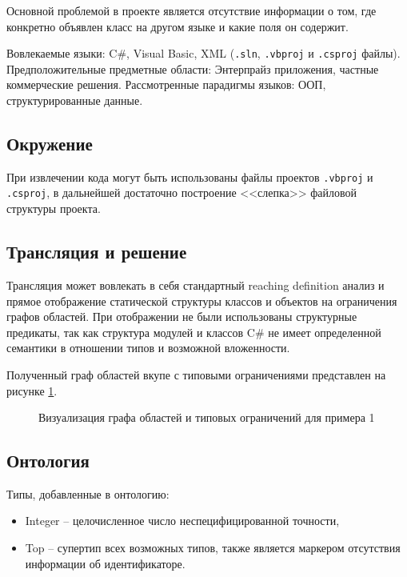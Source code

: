 Основной проблемой в проекте является отсутствие информации о том, где конкретно объявлен класс на другом языке и какие поля он содержит.

Вовлекаемые языки: C\#, Visual Basic, XML (\texttt{.sln}, \texttt{.vbproj} и \texttt{.csproj} файлы).
Предположительные предметные области: Энтерпрайз приложения, частные коммерческие решения.
Рассмотренные парадигмы языков: ООП, структурированные данные.

\subsection{Окружение}

При извлечении кода могут быть использованы файлы проектов \texttt{.vbproj} и \texttt{.csproj}, в дальнейшей
достаточно построение <<слепка>> файловой структуры проекта.

\subsection{Трансляция и решение}

Трансляция может вовлекать в себя стандартный reaching definition анализ \cite{static-program-analysis} и прямое отображение
статической структуры классов и объектов на ограничения графов областей. При отображении не были использованы
структурные предикаты, так как структура модулей и классов C\# не имеет определенной семантики в отношении
типов и возможной вложенности. 

Полученный граф областей вкупе с типовыми ограничениями представлен на рисунке \ref{fig:example_1}.
\begin{figure}[H]
    \centering
    \caption{Визуализация графа областей и типовых ограничений для примера 1}
    \label{fig:example_1}
\end{figure}

\subsection{Онтология}

Типы, добавленные в онтологию:
\begin{itemize}
    \item Integer -- целочисленное число неспецифицированной точности,
    \item Top -- супертип всех возможных типов, также является маркером отсутствия информации об идентификаторе.
\end{itemize}


